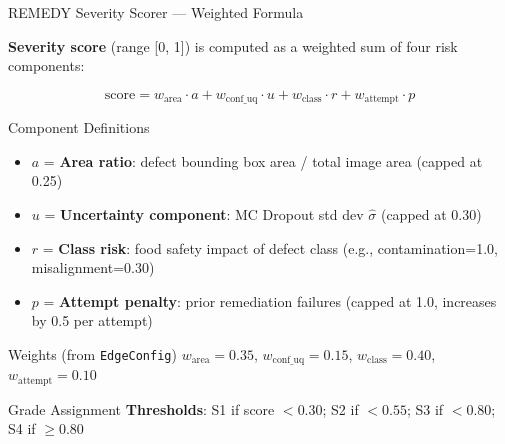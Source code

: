 \documentclass[10pt]{beamer}
\begin{document}
\begin{frame}{REMEDY Severity Scorer --- Weighted Formula}

\small
\textbf{Severity score} (range [0, 1]) is computed as a weighted sum of four risk components:

\vspace{1pt}
\begin{equation*}
\text{score} = w_{\text{area}} \cdot a + w_{\text{conf\_uq}} \cdot u + w_{\text{class}} \cdot r + w_{\text{attempt}} \cdot p
\end{equation*}

\vspace{1pt}
\begin{block}{Component Definitions}
\small
\begin{itemize}\setlength{\itemsep}{4pt}
    \item $a$ = \textbf{Area ratio}: defect bounding box area / total image area (capped at 0.25)
    \item $u$ = \textbf{Uncertainty component}: MC Dropout std dev $\hat{\sigma}$ (capped at 0.30)
    \item $r$ = \textbf{Class risk}: food safety impact of defect class (e.g., contamination=1.0, misalignment=0.30)
    \item $p$ = \textbf{Attempt penalty}: prior remediation failures (capped at 1.0, increases by 0.5 per attempt)
\end{itemize}
\end{block}

\vspace{1pt}
\begin{block}{Weights (from \texttt{EdgeConfig})}
$w_{\text{area}} = 0.35$, \quad $w_{\text{conf\_uq}} = 0.15$, \quad $w_{\text{class}} = 0.40$, \quad $w_{\text{attempt}} = 0.10$
\end{block}

\vspace{1pt}
\begin{block}{Grade Assignment}
\small
\textbf{Thresholds}: S1 if score $< 0.30$; S2 if $< 0.55$; S3 if $< 0.80$; S4 if $\geq 0.80$
\end{block}

\end{frame}
\end{document}
